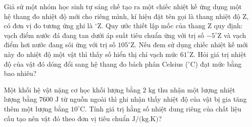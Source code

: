\begin{ex}%
	Giả sử một nhóm học sinh tự sáng chế tạo ra một chiếc nhiệt kế ứng dụng một hệ thang đo nhiệt độ mới cho riêng mình, kí hiệu đặt tên gọi là thang nhiệt độ Z, có đơn vị đo tương ứng ghi là $^\circ\text{Z}$. Quy ước thiết lập mốc của thang Z quy định: vạch điểm nước đá đang tan dưới áp suất tiêu chuẩn ứng với trị số $-5^\circ\text{Z}$ và vạch điểm hơi nước đang sôi ứng với trị số $105^\circ\text{Z}$. Nếu đem sử dụng chiếc nhiệt kế mới này đo nhiệt độ một vật thì thấy số hiển thị chỉ vạch mức $61^\circ\text{Z}$. Hỏi giá trị nhiệt độ của vật đó dóng đổi sang hệ thang đo bách phân Celsius ($^\circ\text{C}$) đạt mức bằng bao nhiêu?
\end{ex}

\begin{ex}%
	Một khối hệ vật nặng cơ học khối lượng bằng $2\text{ kg}$ thu nhận một lượng nhiệt lượng bằng $7600\text{ J}$ từ nguồn ngoài thì ghi nhận thấy nhiệt độ của vật bị gia tăng thêm một lượng bằng $10^\circ\text{C}$. Tính giá trị hằng số nhiệt dung riêng của chất liệu cấu tạo nên vật đó theo đơn vị tiêu chuẩn $\text{J/(kg.K)}$?
\end{ex}

